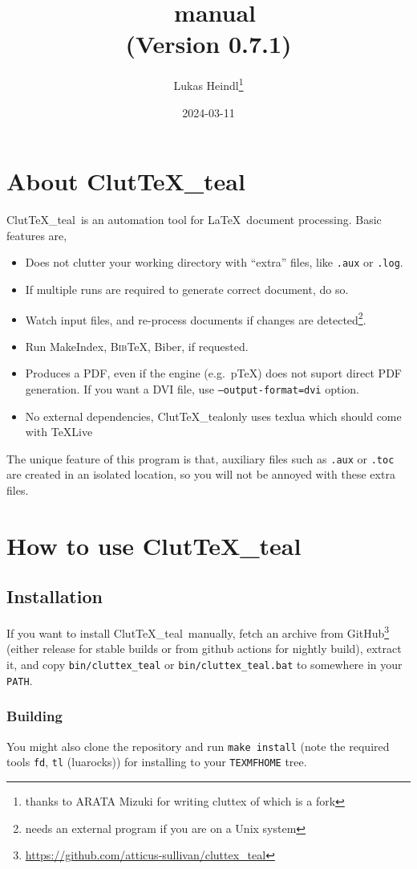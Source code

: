 \documentclass[a4paper]{report}
\title{\ClutTeX\ manual\\(Version 0.7.1)}
\author{Lukas Heindl\thanks{thanks to ARATA Mizuki for writing cluttex of which \ClutTeX{} is a fork}}
\date{2024-03-11}
\newcommand\ClutTeX{Clut\TeX\_teal}
\providecommand\BibTeX{\textsc{Bib}\TeX}
\begin{document}
\maketitle
\tableofcontents

\chapter{About \ClutTeX}
\ClutTeX\ is an automation tool for \LaTeX\ document processing.
Basic features are,
\begin{itemize}
\item Does not clutter your working directory with ``extra'' files, like \texttt{.aux} or \texttt{.log}.
\item If multiple runs are required to generate correct document, do so.
\item Watch input files, and re-process documents if changes are detected\footnote{needs an external program if you are on a Unix system}.
\item Run MakeIndex, \BibTeX, Biber, if requested.
\item Produces a PDF, even if the engine (e.g.\ p\TeX) does not suport direct PDF generation.
  If you want a DVI file, use \texttt{--output-format=dvi} option.
\item No external dependencies, \ClutTeX only uses texlua which should come with TeXLive
\end{itemize}

The unique feature of this program is that, auxiliary files such as \texttt{.aux} or \texttt{.toc} are created in an isolated location, so you will not be annoyed with these extra files.


\chapter{How to use \ClutTeX}
\section{Installation}
If you want to install \ClutTeX\ manually, fetch an archive from
GitHub\footnote{\url{https://github.com/atticus-sullivan/cluttex_teal}} (either
release for stable builds or from github actions for nightly build), extract
it, and copy \texttt{bin/cluttex\_teal} or \texttt{bin/cluttex\_teal.bat} to
somewhere in your \texttt{PATH}.

\subsection{Building}
You might also clone the repository and run \texttt{make install} (note the
required tools \texttt{fd}, \texttt{tl} (luarocks)) for installing to your
\texttt{TEXMFHOME} tree.
\end{document}
